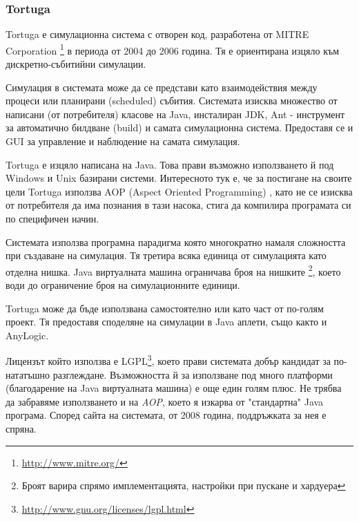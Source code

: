		\subsubsection{Tortuga}
		
			Tortuga е симулационна система с отворен код, разработена от MITRE Corporation
			\footnote{\url{http://www.mitre.org/}} в периода от 2004 до 2006 година.
			Тя е ориентирана изцяло към дискретно-събитийни симулации.
			
			
				Симулация в системата може да се представи като взаимодействия между процеси или планирани (scheduled) събития.
				Системата изисква множество от написани (от потребителя) класове на Java, инсталиран \ac{JDK}, 
				Ant - инструмент за автоматично билдване (build) и самата симулационна система. 
				Предоставя се и \ac{GUI} за управление и наблюдение на самата симулация.
			
			
				Tortuga е изцяло написана на Java. Това прави възможно използването й под Windows и Unix базирани системи.
				Интересното тук е, че за постигане на своите цели Tortuga използва AOP (Aspect Oriented Programming)
				\cite{AOP}, като не се изисква от потребителя да има познания в тази насока, стига да компилира 
				програмата си по специфичен начин. 			
			
			
				Системата използва програмна парадигма която многократно намаля сложността при създаване на симулация.
				Тя третира всяка единица от симулацията като отделна нишка. Java виртуалната машина ограничава броя на нишките
				\footnote{Броят варира спрямо имплементацията, настройки при пускане и хардуера}, 
				което води до ограничение броя на симулационните единици.
			
			
	 			Tortuga може да бъде използвана самостоятелно или като част от по-голям проект. 
	 			Тя предоставя споделяне на симулации в Java аплети, също както и AnyLogic.
 			
 			
	 			Лицензът който използва е \ac{LGPL}\footnote{\url{http://www.gnu.org/licenses/lgpl.html}}, 
	 			което прави системата добър кандидат за по-нататъшно разглеждане.
	 			Възможността й за използване под много платформи (благодарение на Java виртуалната машина) е 
	 			още един голям плюс.
	 			Не трябва да забравяме използването и на \emph{AOP}, което я изкарва от "стандартна" Java програма.
	 			Според сайта на системата, от 2008 година, поддръжката за нея е спряна. \cite{Tortuga}
					
